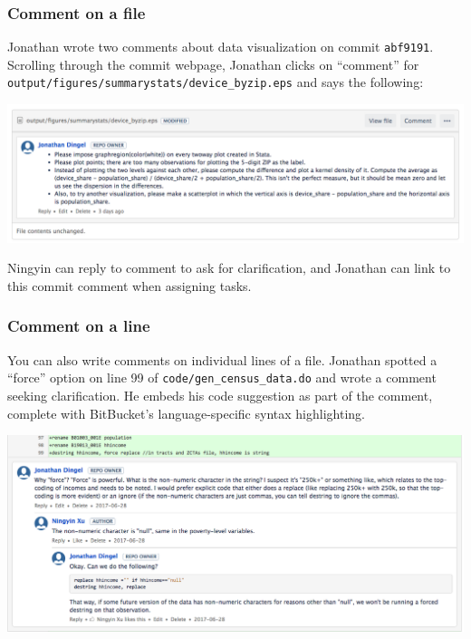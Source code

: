 \subsubsection{Comment on a file}
Jonathan wrote two comments about data visualization on commit \texttt{abf9191}.
Scrolling through the commit webpage, Jonathan clicks on ``comment'' for \texttt{output/figures/summarystats/device\_byzip.eps} and says the following:
\begin{center}\includegraphics[width=.8\textwidth]{./figures/workflow/BitBucket_screenshot_commenting1.png}\end{center}
Ningyin can reply to comment to ask for clarification, and Jonathan can link to this commit comment when assigning tasks.

\subsubsection{Comment on a line}
You can also write comments on individual lines of a file.
Jonathan spotted a ``force'' option on line 99 of \texttt{code/gen\_census\_data.do} and wrote a comment seeking clarification.
He embeds his code suggestion as part of the comment, complete with BitBucket's language-specific syntax highlighting.
\begin{center}\includegraphics[width=\textwidth]{./figures/workflow/BitBucket_screenshot_commenting2.png}\end{center}

